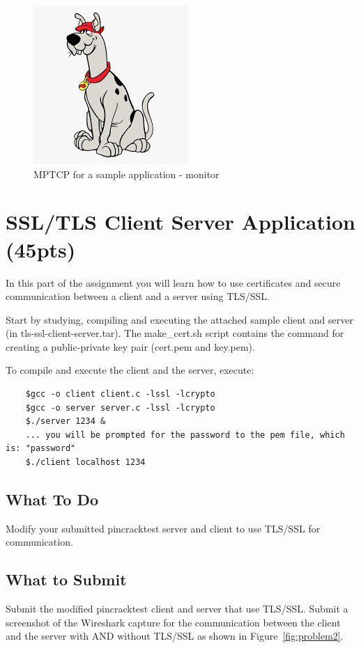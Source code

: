 \documentclass[11pt]{article}
\begin{document}
\begin{figure}[ht]
\centering
\includegraphics[width=.49\columnwidth]{dummy.png}
\hspace{10mm}
\caption{MPTCP for a sample application - monitor}
\label{fig:problem1-4}
\end{figure}

\section{SSL/TLS Client Server Application (45pts)}
In this part of the assignment you will learn how to use certificates and secure communication between a client and a server using TLS/SSL.

Start by studying, compiling and executing the attached sample client and server (in tls-ssl-client-server.tar). The make\_cert.sh script contains the command for creating a public-private key pair (cert.pem and key.pem).

To compile and execute the client and the server, execute:

\begin{verbatim}
    $gcc -o client client.c -lssl -lcrypto
    $gcc -o server server.c -lssl -lcrypto
    $./server 1234 &
    ... you will be prompted for the password to the pem file, which is: "password"
    $./client localhost 1234
\end{verbatim}

\subsection{What To Do}
Modify your submitted pincracktest server and client to use TLS/SSL for communication.

\subsection{What to Submit}
Submit the modified pincracktest client and server that use TLS/SSL.
Submit a screenshot of the Wireshark capture for the communication between the client and the server with AND without TLS/SSL as shown in Figure~\ref{fig:problem2}.
\end{document}
